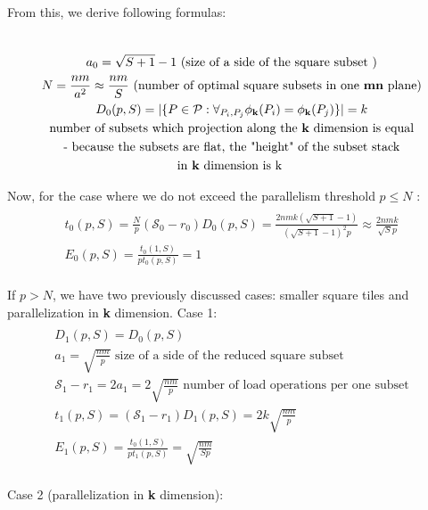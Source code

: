\documentclass[sigconf]{acmart}
\begin{document}
From this, we derive following formulas:

\begin{multline}
\\
a_0 = \sqrt{S+1} - 1   \text{ (size of a side of the square subset )}\\
N = \frac{nm}{a^2} \approx \frac{nm}{S}  \text{ (number of optimal square 
	subsets in one \textbf{mn} plane)}\\
D_0(p,S) = |\{P \in \mathcal{P} : \forall_{P_i, P_j} \phi_{\mathbf{k}}(P_i) = 
\phi_{\mathbf{k}}(P_j)\}| = k \\
\text{number of subsets which projection along the \textbf{k} dimension is 
	equal} \\ 
\text{- because the subsets are flat, the "height" of the 
	subset stack}
\\ 
\text{in \textbf{k} dimension is k }\\
\end{multline}

Now, for the case where we do not exceed the parallelism threshold  $p \le N$ : 
\begin{multline}
\\
t_0(p,S) = \frac{N}{p} (\mathcal{S}_0 - r_0) D_0(p,S) = \frac{2nmk(\sqrt{S+1} 
	- 
	1)}{(\sqrt{S+1} - 1)^2 p} \approx \frac{2nmk}{\sqrt{S} p}  \\
E_0(p,S) = \frac{t_0(1,S)}{p t_0(p,S)} = 1 \\
\end{multline}

If  $p > N$, we have two previously discussed cases: smaller square tiles and 
parallelization in \textbf{k} dimension. Case 1:
\begin{multline}
\\
D_1(p,S) = D_0(p,S) \\
a_1 = \sqrt{\frac{nm}{p}} \text{ size of a side of the reduced square 
	subset} \\
\mathcal{S}_1 - r_1 = 2a_1 = 2\sqrt{\frac{nm}{p}} \text{ number of load 
	operations per one subset} \\
t_1(p,S) = (\mathcal{S}_1 - r_1) D_1(p,S) = 2k \sqrt{\frac{nm}{p}}  \\
E_1(p,S) = \frac{t_0(1,S)}{p t_1(p,S)} = \sqrt{\frac{nm}{Sp}} \\
\end{multline}

Case 2 (parallelization in \textbf{k} dimension): 
\end{document}
